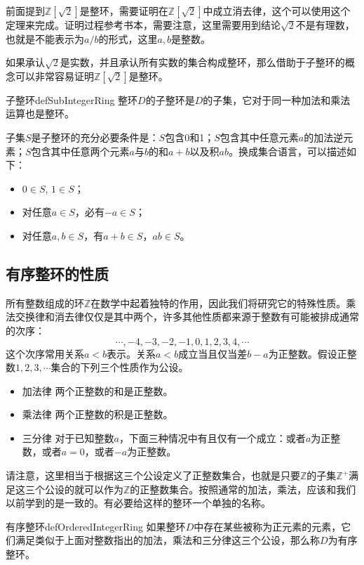 前面提到$\mathbb{Z}[\sqrt{2}]$是整环，需要证明在$\mathbb{Z}[\sqrt{2}]$中成立消去律，这个可以使用这个定理来完成。证明过程参考书本，需要注意，这里需要用到结论$\sqrt{2}$不是有理数，也就是不能表示为$a/b$的形式，这里$a, b$是整数。

如果承认$\sqrt{2}$是实数，并且承认所有实数的集合构成整环，那么借助于子整环的概念可以非常容易证明$\mathbb{Z}[\sqrt{2}]$是整环。
\begin{definition}{子整环}{defSubIntegerRing}
整环$D$的子整环是$D$的子集，它对于同一种加法和乘法运算也是整环。
\end{definition}

子集$S$是子整环的充分必要条件是：$S$包含0和1；$S$包含其中任意元素$a$的加法逆元素；$S$包含其中任意两个元素$a$与$b$的和$a+b$以及积$ab$。换成集合语言，可以描述如下：
\begin{itemize}
\item $0 \in S$, $1 \in S$；
\item 对任意$a \in S$，必有$-a \in S$；
\item 对任意$a, b \in S$，有$a + b \in S$，$ab \in S$。
\end{itemize}


\subsection{有序整环的性质}\label{subsection00103}
所有整数组成的环$\mathbb{Z}$在数学中起着独特的作用，因此我们将研究它的特殊性质。乘法交换律和消去律仅仅是其中两个，许多其他性质都来源于整数有可能被排成通常的次序：
\[
\cdots,-4,-3,-2,-1,0,1,2,3,4,\cdots
\]
这个次序常用关系$a<b$表示。关系$a<b$成立当且仅当差$b-a$为正整数。假设正整数$1,2,3,\cdots$集合的下列三个性质作为公设。
\begin{itemize}
\item 加法律 两个正整数的和是正整数。
\item 乘法律 两个正整数的积是正整数。
\item 三分律 对于已知整数$a$，下面三种情况中有且仅有一个成立：或者$a$为正整数，或者$a=0$，或者$-a$为正整数。
\end{itemize}

请注意，这里相当于根据这三个公设定义了正整数集合，也就是只要$\mathbb{Z}$的子集$\mathbb{Z}^+$满足这三个公设的就可以作为$\mathbb{Z}$的正整数集合。按照通常的加法，乘法，应该和我们以前学到的是一致的。有必要给这样的整环一个单独的名称。

\begin{definition}{有序整环}{defOrderedIntegerRing}
如果整环$D$中存在某些被称为正元素的元素，它们满足类似于上面对整数指出的加法，乘法和三分律这三个公设，那么称$D$为有序整环。
\end{definition}

